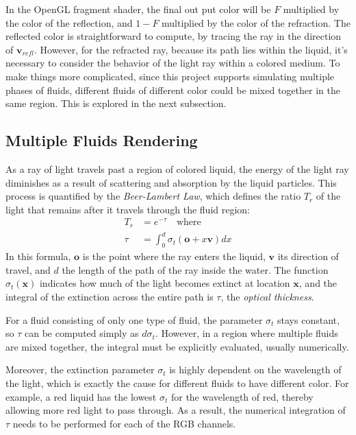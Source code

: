 In the OpenGL fragment shader, the final out put color will be $F$ multiplied by the color of the reflection, and $1-F$ multiplied by the color of the refraction. The reflected color is straightforward to compute, by tracing the ray in the direction of $\textbf{v}_{refl}$. However, for the refracted ray, because its path lies within the liquid, it's necessary to consider the behavior of the light ray within a colored medium. To make things more complicated, since this project supports simulating multiple phases of fluids, different fluids of different color could be mixed together in the same region. This is explored in the next subsection.

\subsection{Multiple Fluids Rendering}
\label{subsection multiphase render}
As a ray of light travels past a region of colored liquid, the energy of the light ray diminishes as a result of scattering and absorption by the liquid particles. This process is quantified by the \textit{Beer-Lambert Law}, which defines the ratio $T_r$ of the light that remains after it travels through the fluid region:
\begin{equation*}
    \begin{aligned}
        T_r &= e^{-\tau} \mbox{~~~where}\\
        \tau &= \int_0^{d} \sigma_t(\textbf{o}+x\textbf{v}) dx
    \end{aligned}
\end{equation*}
In this formula, $\textbf{o}$ is the point where the ray enters the liquid, $\textbf{v}$ its direction of travel, and $d$ the length of the path of the ray inside the water. The function $\sigma_t(\textbf{x})$ indicates how much of the light becomes extinct at location $\textbf{x}$, and the integral of the extinction across the entire path is $\tau$, the \textit{optical thickness}.

For a fluid consisting of only one type of fluid, the parameter $\sigma_t$ stays constant, so $\tau$ can be computed simply as $d\sigma_t$. However, in a region where multiple fluids are mixed together, the integral must be explicitly evaluated, usually numerically.

Moreover, the extinction parameter $\sigma_t$ is highly dependent on the wavelength of the light, which is exactly the cause for different fluids to have different color. For example, a red liquid has the lowest $\sigma_t$ for the wavelength of red, thereby allowing more red light to pass through. As a result, the numerical integration of $\tau$ needs to be performed for each of the RGB channels.

